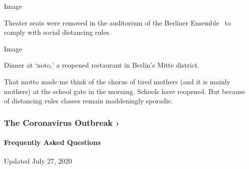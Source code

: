 Image

Theater seats were removed in the auditorium of the Berliner Ensemble~
to comply with social distancing rules.

Image

Dinner at `noto,' a reopened restaurant in Berlin's Mitte district.

That motto made me think of the chorus of tired mothers (and it is
mainly mothers) at the school gate in the morning. Schools have
reopened. But because of distancing rules classes remain maddeningly
sporadic.

\href{https://www.nytimes.com/news-event/coronavirus?action=click\&pgtype=Article\&state=default\&region=MAIN_CONTENT_3\&context=storylines_faq}{}

\hypertarget{the-coronavirus-outbreak-}{%
\subsubsection{The Coronavirus Outbreak
›}\label{the-coronavirus-outbreak-}}

\hypertarget{frequently-asked-questions}{%
\paragraph{Frequently Asked
Questions}\label{frequently-asked-questions}}

Updated July 27, 2020

